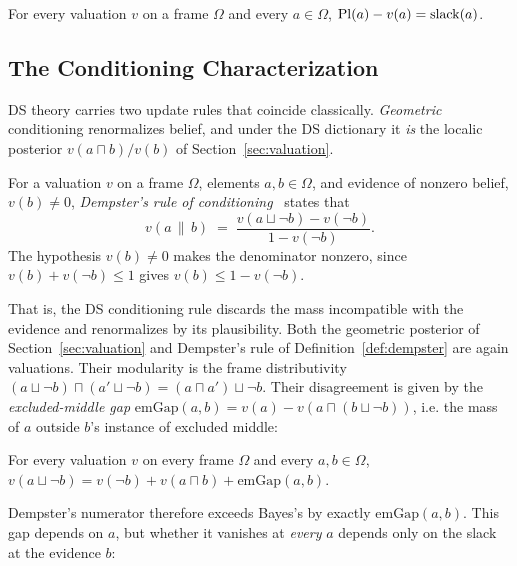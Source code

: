 \begin{theorem}
\label{thm:interval-width}
For every valuation $v$ on a frame $\Omega$ and every $a \in \Omega$,
$\mathrm{Pl}(a) - v(a) = \mathrm{slack}(a)$.
\end{theorem}


\subsection{The Conditioning Characterization}

DS theory carries two update rules that coincide classically.
\emph{Geometric} conditioning renormalizes belief, and under the DS
dictionary it \emph{is} the localic posterior
$v(a \sqcap b)/v(b)$ of Section~\ref{sec:valuation}.

\begin{definition}
\label{def:dempster}
For a valuation $v$ on a frame $\Omega$, elements $a, b \in \Omega$, and
evidence of nonzero belief, $v(b) \neq 0$,
\emph{Dempster's rule of conditioning}~\cite{shafer1976}
states that
\[
  v(a \,\|\, b) \;=\;
  \frac{v(a \sqcup \neg b) - v(\neg b)}
       {1 - v(\neg b)}.
\]
The hypothesis $v(b) \neq 0$ makes the denominator nonzero, since
$v(b) + v(\neg b) \le 1$ gives $v(b) \le 1 - v(\neg b)$.
\end{definition}

\noindent
That is, the DS conditioning rule discards
the mass incompatible with the evidence and renormalizes by its
plausibility.
Both the geometric posterior of Section~\ref{sec:valuation} and
Dempster's rule of Definition~\ref{def:dempster} are again
valuations.  Their modularity
is the frame distributivity
$(a \sqcup \neg b) \sqcap (a' \sqcup \neg b)
= (a \sqcap a') \sqcup \neg b$.  Their disagreement is
given by the \emph{excluded-middle
gap} $\mathrm{emGap}(a,b) = v(a) - v(a \sqcap (b \sqcup
\neg b))$, i.e. the mass of $a$ outside $b$'s instance
of excluded middle:

\begin{lemma}
For every valuation $v$ on every frame $\Omega$ and every
$a, b \in \Omega$,
$v(a \sqcup \neg b) = v(\neg b) + v(a \sqcap b) +
\mathrm{emGap}(a,b)$.
\end{lemma}

Dempster's numerator therefore exceeds Bayes's by exactly
$\mathrm{emGap}(a,b)$.  This gap depends on $a$, but whether it
vanishes at \emph{every} $a$ depends only on
the slack at the evidence $b$:

